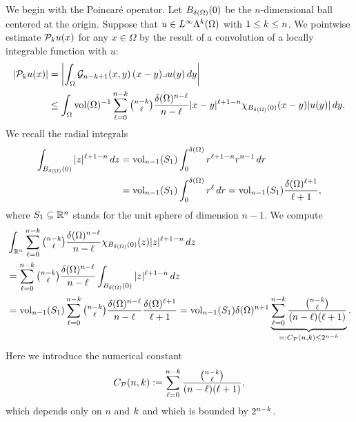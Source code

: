 \documentclass[10pt,a4paper]{article}
\begin{document}
We begin with the Poincar\'e operator. 
Let $B_{{\delta}(\Omega)}(0)$ be the $n$-dimensional ball centered at the origin.
Suppose that $u \in L^{\infty}\Lambda^{k}(\Omega)$ with $1 \leq k \leq n$.
We pointwise estimate ${\mathcal P}_{k} u(x)$ for any $x \in \Omega$ by the result of a convolution of a locally integrable function with $u$:
\begin{align*}
    \left| {\mathcal P}_{k} u(x) \right|
    &=
    \left| 
        \int_{\Omega} {\mathcal G}_{n-k+1}(x,y) \,(x-y)\lrcorner u(y)\,dy
    \right| 
    \\&\leq 
    \int_{\Omega} \operatorname{vol}(\Omega)^{-1} \sum_{\ell=0}^{ n-k }\tbinom{ n-k }{\ell} \frac{ {\delta}(\Omega)^{n-\ell} }{n-\ell} |x-y|^{\ell+1-n} \chi_{B_{{\delta}(\Omega)}(0)}(x-y) |u(y)| \,dy
    .
\end{align*}
We recall the radial integrals 
\begin{align*}
    \int_{B_{{\delta}(\Omega)}(0)} |z|^{\ell+1-n} \,dz
    &
    =
    \operatorname{vol}_{n-1}(S_1) \int_{0}^{{\delta}(\Omega)} r^{\ell+1-n} r^{n-1} \,dr
    \\&
    =
    \operatorname{vol}_{n-1}(S_1) \int_{0}^{{\delta}(\Omega)} r^{\ell} \,dr
    =
    \operatorname{vol}_{n-1}(S_1) \frac{{\delta}(\Omega)^{\ell+1}}{\ell+1}
    ,
\end{align*}
where $S_1 \subseteq {\mathbb R}^{n}$ stands for the unit sphere of dimension $n-1$. 
We compute 
\begin{align*}
    &
    \int_{{\mathbb R}^{n}} \sum_{\ell=0}^{n-k} \tbinom{n-k}{\ell} \frac{ {\delta}(\Omega)^{n-\ell} }{n-\ell} \chi_{B_{{\delta}(\Omega)}(0)}(z) |z|^{\ell+1-n} \,dz
    \\&
    =
    \sum_{\ell=0}^{n-k} \tbinom{n-k}{\ell} \frac{ {\delta}(\Omega)^{n-\ell} }{n-\ell} \int_{B_{{\delta}(\Omega)}(0)} |z|^{\ell+1-n} \,dz
    \\&
    =
    \operatorname{vol}_{n-1}(S_1) \sum_{\ell=0}^{n-k} \tbinom{n-k}{\ell} \frac{ {\delta}(\Omega)^{n-\ell} }{n-\ell} \frac{{\delta}(\Omega)^{\ell+1}}{\ell+1}
    =
    \operatorname{vol}_{n-1}(S_1) {\delta}(\Omega)^{n+1} \underbrace{ \sum_{\ell=0}^{n-k} \frac{ \tbinom{n-k}{\ell} }{ (n-\ell)(\ell+1) } }_{ =: C_{{\mathcal P}}(n,k) \leq 2^{n-k}}
    .
\end{align*}
Here we introduce the numerical constant 
\begin{gather}\label{equation:A_Poinc}
    C_{{\mathcal P}}(n,k) := \sum_{\ell=0}^{n-k} \frac{ \tbinom{n-k}{\ell} }{ (n-\ell)(\ell+1) },
\end{gather}
which depends only on $n$ and $k$ and which is bounded by $2^{n-k}$. 
\end{document}
